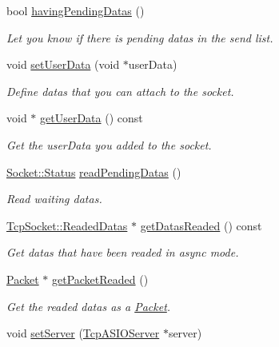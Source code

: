 \begin{DoxyCompactItemize}
bool \hyperlink{classmognetwork_1_1_tcp_socket_a7269551095b10d859f8710cb5aaed3d6}{having\-Pending\-Datas} ()
\begin{DoxyCompactList}\small\item\em Let you know if there is pending datas in the send list. \end{DoxyCompactList}\item 
void \hyperlink{classmognetwork_1_1_tcp_socket_a2d7327be349e705c74bdc6b40c1b2520}{set\-User\-Data} (void $\ast$user\-Data)
\begin{DoxyCompactList}\small\item\em Define datas that you can attach to the socket. \end{DoxyCompactList}\item 
void $\ast$ \hyperlink{classmognetwork_1_1_tcp_socket_adef63a929423324fd75888e2195176e0}{get\-User\-Data} () const 
\begin{DoxyCompactList}\small\item\em Get the user\-Data you added to the socket. \end{DoxyCompactList}\item 
\hyperlink{classmognetwork_1_1_socket_aa187a8394ac0d6203af0ec7f021ca15f}{Socket\-::\-Status} \hyperlink{classmognetwork_1_1_tcp_socket_af3918374ee41223b77f669367d4b0e22}{read\-Pending\-Datas} ()
\begin{DoxyCompactList}\small\item\em Read waiting datas. \end{DoxyCompactList}\item 
\hyperlink{structmognetwork_1_1_tcp_socket_1_1_readed_datas}{Tcp\-Socket\-::\-Readed\-Datas} $\ast$ \hyperlink{classmognetwork_1_1_tcp_socket_a6dbe149a276fb24203267762fbd1c276}{get\-Datas\-Readed} () const 
\begin{DoxyCompactList}\small\item\em Get datas that have been readed in async mode. \end{DoxyCompactList}\item 
\hyperlink{classmognetwork_1_1_packet}{Packet} $\ast$ \hyperlink{classmognetwork_1_1_tcp_socket_ac8619a5f869abfda7b8c2d32c94870f3}{get\-Packet\-Readed} ()
\begin{DoxyCompactList}\small\item\em Get the readed datas as a \hyperlink{classmognetwork_1_1_packet}{Packet}. \end{DoxyCompactList}\item 
void \hyperlink{classmognetwork_1_1_tcp_socket_ae35e2fd8fbf6f9d3bdb87650b3bedff1}{set\-Server} (\hyperlink{classmognetwork_1_1_tcp_a_s_i_o_server}{Tcp\-A\-S\-I\-O\-Server} $\ast$server)

\end{DoxyCompactItemize}
